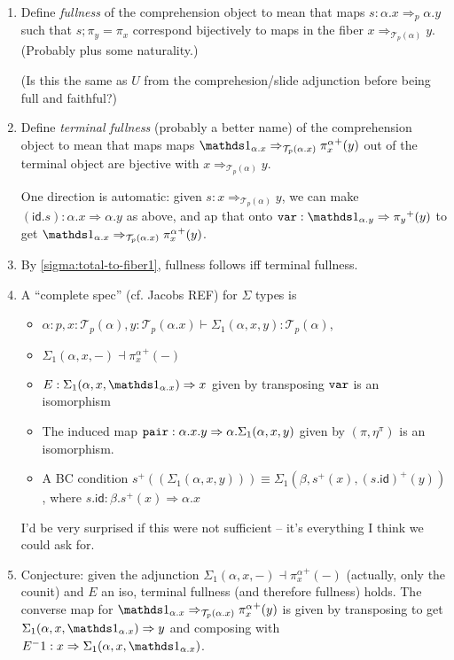 \documentclass[10pt]{article}
\theoremstyle{definition}
\newcommand{\tcell}{\Rightarrow}
\newcommand{\id}{\mathsf{id}}
\newcommand\TrPlus[2]{\ensuremath{{#1}^+(#2)}}
\newcommand\El[2]{\mathcal{T}_{#1}(#2)}
\begin{document}
\begin{enumerate}
\item \label{sigma:full} Define \emph{fullness} of the comprehension
  object to mean that maps $s : \alpha.x \tcell_p \alpha.y$ such that
  $s;\pi_y = \pi_x$ correspond bijectively to maps in the fiber $x
  \tcell_{\El{p}{\alpha}} y$.  (Probably plus some naturality.)

  (Is this the same as $U$ from the comprehesion/slide adjunction before
  being full and faithful?)

\item \label{sigma:full-interesting} Define \emph{terminal fullness}
  (probably a better name) of the comprehension object to mean that maps
  maps $\One_{\alpha.x} \tcell_{\El{p}{\alpha.x}} \TrPlus{\pi^\alpha_x}{y}$
  out of the terminal object are bjective with $x
  \tcell_{\El{p}{\alpha}} y$.

  One direction is automatic: given $s : x \tcell_{\El{p}{\alpha}} y$,
  we can make $(\id.s) : \alpha.x \tcell \alpha.y$ as above, and ap that
  onto $\mtt{var} : \One_{\alpha.y} \tcell \TrPlus{\pi_y}{y}$ to get
  $\One_{\alpha.x} \tcell_{\El{p}{\alpha.x}} \TrPlus{\pi^\alpha_x}{y}$.

\item By \ref{sigma:total-to-fiber1}, fullness follows iff terminal
  fullness.  
  
\item \label{sigma:complete}

  A ``complete spec'' (cf. Jacobs REF) for $\Sigma$ types is
  \begin{itemize}
  \item $\alpha : p, x : \El{p}{\alpha}, y : \El{p}{\alpha.x} \vdash \Sigma_1(\alpha,x,y) : \El{p}{\alpha}$,
  \item $\Sigma_1(\alpha,x,-) \dashv \TrPlus{\pi^\alpha_x}{-}$
  \item $E : \Sigma_1(\alpha,x,\One_{\alpha.x}) \tcell x$ given by
    transposing $\mathtt{var}$ is an isomorphism
  \item The induced map $\mtt{pair} : \alpha.x.y \tcell
    \alpha.\Sigma_1(\alpha,x,y)$ given by $(\pi, \eta^\pi)$ is an
    isomorphism.
  \item A BC condition $\TrPlus{s}{(\Sigma_1(\alpha,x,y))} \equiv
    \Sigma_1(\beta,\TrPlus{s}{x}, \TrPlus{(s . \id)}{y})$,
    where $s.\id : \beta.\TrPlus{s}{x} \tcell \alpha.x$
  \end{itemize}
  I'd be very surprised if this were not sufficient -- it's everything I
  think we could ask for.

\item Conjecture: given the adjunction $\Sigma_1(\alpha,x,-) \dashv
  \TrPlus{\pi^\alpha_x}{-}$ (actually, only the counit) and $E$ an iso,
  terminal fullness (and therefore fullness) holds.  The converse map
  for $\One_{\alpha.x} \tcell_{\El{p}{\alpha.x}} \TrPlus{\pi^\alpha_x}{y}$
  is given by transposing to get $\Sigma_1(\alpha,x,\One_{\alpha.x}) \tcell
  y$ and composing with $E^-1 : x \tcell
  \Sigma_1(\alpha,x,\One_{\alpha.x})$.


\end{enumerate}
\end{document}

